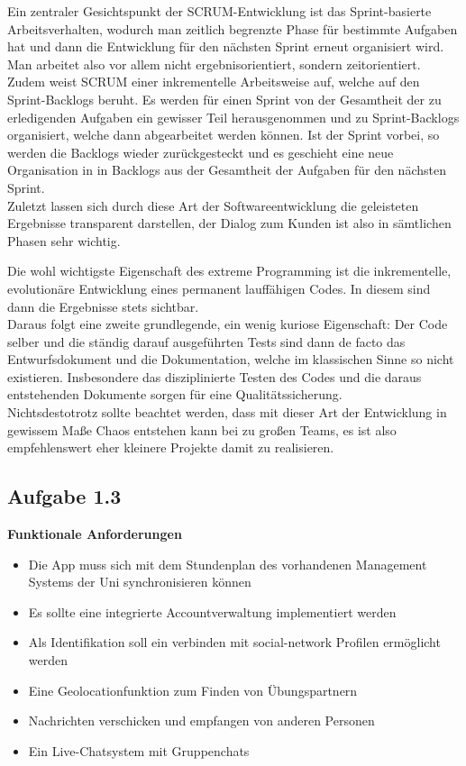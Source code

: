 \documentclass[a4paper,graphics,11pt]{article}
\newcommand\aufgabe[1]{\subsection*{Aufgabe #1}}
\begin{document}
Ein zentraler Gesichtspunkt der SCRUM-Entwicklung ist das Sprint-basierte Arbeitsverhalten, wodurch man zeitlich begrenzte Phase für bestimmte Aufgaben hat und 
dann die Entwicklung für den nächsten Sprint erneut organisiert wird. Man arbeitet also vor allem nicht ergebnisorientiert, sondern zeitorientiert. \\
Zudem weist SCRUM einer inkrementelle Arbeitsweise auf, welche auf den Sprint-Backlogs beruht. Es werden für einen Sprint von der Gesamtheit der zu erledigenden
Aufgaben ein gewisser Teil herausgenommen und zu Sprint-Backlogs organisiert, welche dann abgearbeitet werden können. Ist der Sprint vorbei, so werden die
Backlogs wieder zurückgesteckt und es geschieht eine neue Organisation in in Backlogs aus der Gesamtheit der Aufgaben für den nächsten Sprint. \\
Zuletzt lassen sich durch diese Art der Softwareentwicklung die geleisteten Ergebnisse transparent darstellen, der Dialog zum Kunden ist also in sämtlichen
Phasen sehr wichtig. \par
Die wohl wichtigste Eigenschaft des extreme Programming ist die inkrementelle, evolutionäre Entwicklung eines permanent lauffähigen Codes. In diesem sind dann
die Ergebnisse stets sichtbar. \\
Daraus folgt eine zweite grundlegende, ein wenig kuriose Eigenschaft: Der Code selber und die ständig darauf ausgeführten Tests sind dann de facto das Entwurfsdokument
und die Dokumentation, welche im klassischen Sinne so nicht existieren. Insbesondere das disziplinierte Testen des Codes und die daraus entstehenden Dokumente sorgen
für eine Qualitätssicherung. \\
Nichtsdestotrotz sollte beachtet werden, dass mit dieser Art der Entwicklung in gewissem Maße Chaos entstehen kann bei zu großen Teams, es ist also empfehlenswert
eher kleinere Projekte damit zu realisieren.

\aufgabe{1.3}
\textbf{Funktionale Anforderungen}\\
\begin{itemize}
\item Die App muss sich mit dem Stundenplan des vorhandenen Management Systems der Uni synchronisieren können\\
\item Es sollte eine integrierte Accountverwaltung implementiert werden\\
\item Als Identifikation soll ein verbinden mit social-network Profilen ermöglicht werden\\
\item Eine Geolocationfunktion zum Finden von Übungspartnern \\
\item Nachrichten verschicken und empfangen von anderen Personen\\
\item Ein Live-Chatsystem mit Gruppenchats \\
\end{itemize}
\end{document}
